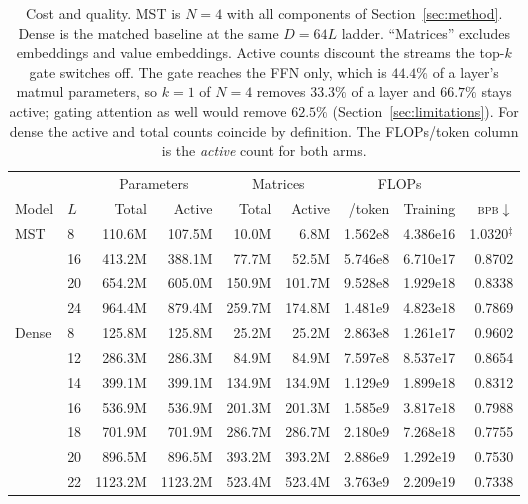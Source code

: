\documentclass{article}
\newcommand{\bpb}{\textsc{bpb}}
\newcommand{\dmodel}{D}
\newcommand{\nsub}{N}
\begin{document}
\begin{table}[t]
\caption{Cost and quality. MST is $\nsub{=}4$ with all components of
Section~\ref{sec:method}. Dense is the matched baseline at the same $\dmodel = 64L$
ladder. ``Matrices'' excludes embeddings and value embeddings. Active counts discount
the streams the top-$k$ gate switches off. The gate reaches the FFN only, which is
$44.4\%$ of a layer's matmul parameters, so $k{=}1$ of $\nsub{=}4$ removes $33.3\%$ of a
layer and $66.7\%$ stays active; gating attention as well would remove $62.5\%$
(Section~\ref{sec:limitations}). For dense the active and total counts coincide by
definition. The FLOPs/token column is the \emph{active} count for both arms.}
\label{tab:cost}
\begin{center}
\begin{small}
\setlength{\tabcolsep}{4.5pt}
\begin{tabular}{llrrrrrrr}
\toprule
& & \multicolumn{2}{c}{Parameters} & \multicolumn{2}{c}{Matrices}
& \multicolumn{2}{c}{FLOPs} & \\
\cmidrule(lr){3-4}\cmidrule(lr){5-6}\cmidrule(lr){7-8}
Model & $L$ & Total & Active & Total & Active & /token & Training & \bpb $\downarrow$ \\
\midrule
\multirow{4}{*}{MST}
 & 8  & 110.6M   & 107.5M   & 10.0M    & 6.8M     & 1.562e8 & 4.386e16 & 1.0320$^\ddagger$ \\
 & 16 & 413.2M   & 388.1M   & 77.7M    & 52.5M    & 5.746e8 & 6.710e17 & 0.8702 \\
 & 20 & 654.2M   & 605.0M   & 150.9M   & 101.7M   & 9.528e8 & 1.929e18 & 0.8338 \\
 & 24 & 964.4M   & 879.4M   & 259.7M   & 174.8M   & 1.481e9 & 4.823e18 & 0.7869 \\
\midrule
\multirow{11}{*}{Dense}
 & 8  & 125.8M   & 125.8M   & 25.2M    & 25.2M    & 2.863e8 & 1.261e17 & 0.9602 \\
 & 12 & 286.3M   & 286.3M   & 84.9M    & 84.9M    & 7.597e8 & 8.537e17 & 0.8654 \\
 & 14 & 399.1M   & 399.1M   & 134.9M   & 134.9M   & 1.129e9 & 1.899e18 & 0.8312 \\
 & 16 & 536.9M   & 536.9M   & 201.3M   & 201.3M   & 1.585e9 & 3.817e18 & 0.7988 \\
 & 18 & 701.9M   & 701.9M   & 286.7M   & 286.7M   & 2.180e9 & 7.268e18 & 0.7755 \\
 & 20 & 896.5M   & 896.5M   & 393.2M   & 393.2M   & 2.886e9 & 1.292e19 & 0.7530 \\
 & 22 & 1123.2M  & 1123.2M  & 523.4M   & 523.4M   & 3.763e9 & 2.209e19 & 0.7338 \\

\end{tabular}
\end{small}
\end{center}
\end{table}
\end{document}
